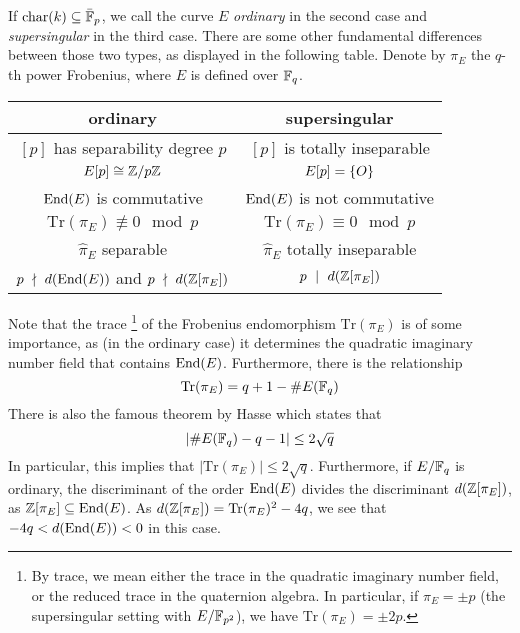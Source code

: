 If $\mathrm{char}(k) \subseteq \bar{\mathbb{F}}_p$, we call the curve $E$ \emph{ordinary} in the second case and \emph{supersingular} in the third case.
There are some other fundamental differences between those two types, as displayed in the following table.
Denote by $\pi_E$ the $q$-th power Frobenius, where $E$ is defined over $\mathbb{F}_q$.
\begin{center}
    \begin{tabular}{c | c}
        ordinary & supersingular \\
        \hline
        $[p]$ has separability degree $p$ & $[p]$ is totally inseparable \\
        $E[p] \cong \mathbb{Z}/p\mathbb{Z}$ & $E[p] = \{ O \}$ \\
        $\mathrm{End}(E)$ is commutative & $\mathrm{End}(E)$ is not commutative \\
        $\mathrm{Tr}(\pi_E) \not\equiv 0 \mod p$ & $\mathrm{Tr}(\pi_E) \equiv 0 \mod p$ \\
        $\hat{\pi}_E$ separable & $\hat{\pi}_E$ totally inseparable \\
        $p \ \nmid \  d(\mathrm{End}(E))$ and $p \ \nmid \  d(\mathbb{Z}[\pi_E])$ & $p \ \mid \  d(\mathbb{Z}[\pi_E])$
    \end{tabular}
\end{center}
Note that the trace
\footnote{By trace, we mean either the trace in the quadratic imaginary number field, or the reduced trace in the quaternion algebra. In particular, if $\pi_E = \pm p$ (the supersingular setting with $E/\mathbb{F}_{p^2}$), we have $\mathrm{Tr}(\pi_E) = \pm 2p$.}
of the Frobenius endomorphism $\mathrm{Tr}(\pi_E)$ is of some importance, as (in the ordinary case) it determines the quadratic imaginary number field that contains $\mathrm{End}(E)$.
Furthermore, there is the relationship
\begin{equation*}
    \mathrm{Tr}(\pi_E) = q + 1 - \#E(\mathbb{F}_q)
\end{equation*}
There is also the famous theorem by Hasse \cite[Thm V.1.1]{arithmetic_elliptic_curves} which states that
\begin{equation*}
    |\#E(\mathbb{F}_q) - q - 1| \leq 2\sqrt{q}
\end{equation*}
In particular, this implies that $|\mathrm{Tr}(\pi_E)| \leq 2\sqrt{q}$.
Furthermore, if $E/\mathbb{F}_q$ is ordinary, the discriminant of the order $\mathrm{End}(E)$ divides the discriminant $d(\mathbb{Z}[\pi_E])$, as $\mathbb{Z}[\pi_E] \subseteq \mathrm{End}(E)$.
As $d(\mathbb{Z}[\pi_E]) = \mathrm{Tr}(\pi_E)^2 - 4q$, we see that $-4q < d(\mathrm{End}(E)) < 0$ in this case.


